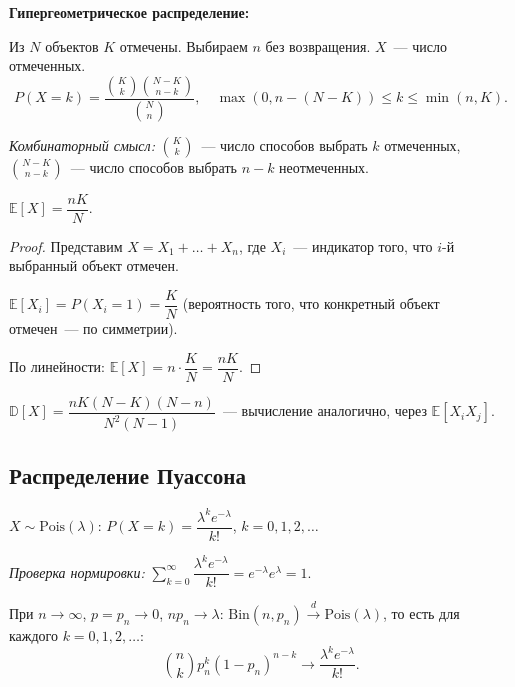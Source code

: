 \documentclass[12pt]{article}
\begin{document}
	\textbf{Гипергеометрическое распределение:}
	
	Из $N$ объектов $K$ отмечены. Выбираем $n$ без возвращения. $X$~--- число отмеченных.
	\[P(X = k) = \frac{\binom{K}{k} \binom{N-K}{n-k}}{\binom{N}{n}}, \quad \max(0, n-(N-K)) \leqslant k \leqslant \min(n, K).\]
	
	\textit{Комбинаторный смысл:} $\binom{K}{k}$~--- число способов выбрать $k$ отмеченных, $\binom{N-K}{n-k}$~--- число способов выбрать $n-k$ неотмеченных.
	
	\begin{theorem}
		$\mathbb{E}[X] = \dfrac{nK}{N}$.
	\end{theorem}
	
	\begin{proof}
		Представим $X = X_1 + \dots + X_n$, где $X_i$~--- индикатор того, что $i$-й выбранный объект отмечен.
		
		$\mathbb{E}[X_i] = P(X_i = 1) = \dfrac{K}{N}$ (вероятность того, что конкретный объект отмечен~--- по симметрии).
		
		По линейности: $\mathbb{E}[X] = n \cdot \dfrac{K}{N} = \dfrac{nK}{N}$.
	\end{proof}
	
	\begin{note}
		$\mathbb{D}[X] = \dfrac{nK(N-K)(N-n)}{N^2(N-1)}$~--- вычисление аналогично, через $\mathbb{E}[X_i X_j]$.
	\end{note}
	
	\subsection{Распределение Пуассона}
	
	\begin{definition}
		$X \sim \text{Pois}(\lambda)$: $P(X = k) = \dfrac{\lambda^k e^{-\lambda}}{k!}$, $k = 0, 1, 2, \dots$
	\end{definition}
	
	\textit{Проверка нормировки:} $\sum_{k=0}^{\infty} \dfrac{\lambda^k e^{-\lambda}}{k!} = e^{-\lambda} e^{\lambda} = 1$.
	
	\begin{theorem}
		При $n \to \infty$, $p = p_n \to 0$, $np_n \to \lambda$: $\text{Bin}(n, p_n) \xrightarrow{d} \text{Pois}(\lambda)$, то есть для каждого $k = 0, 1, 2, \dots$:
		\[\binom{n}{k} p_n^k (1-p_n)^{n-k} \to \frac{\lambda^k e^{-\lambda}}{k!}.\]
	\end{theorem}
	
\end{document}
